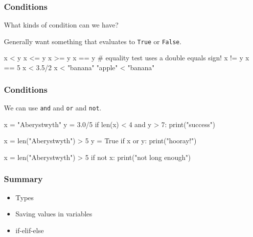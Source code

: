 \documentclass{beamer}
\begin{document}
\begin{frame}[fragile]
\frametitle{Conditions}
What kinds of condition can we have?

Generally want something that evaluates to {\tt True} or {\tt False}.

\begin{code}
x < y
x <= y
x >= y
x == y    # equality test uses a double equals sign!
x != y
x == 5
x < 3.5/2
x < "banana"
"apple" < "banana"
\end{code}
\end{frame}



\begin{frame}[fragile]
\frametitle{Conditions}
We can use {\tt and} and {\tt or} and {\tt not}.

\begin{code}
x = "Aberystwyth"
y = 3.0/5
if len(x) < 4 and y > 7:
   print("success")

x = len("Aberystwyth") > 5
y = True
if x or y:
   print("hooray!")

x = len("Aberystwyth") > 5
if not x:
   print("not long enough")
\end{code}
\end{frame}

\begin{frame}
\frametitle{Summary}
\begin{itemize}
\item Types
\item Saving values in variables
\item if-elif-else
\end{itemize}
\end{frame}
\end{document}
